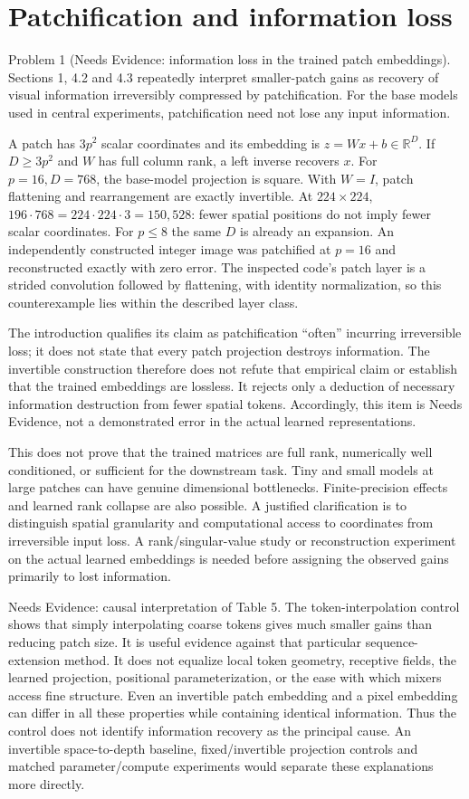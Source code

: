 \documentclass[10pt]{article}
\begin{document}
\section*{Patchification and information loss}
Problem 1 (Needs Evidence: information loss in the trained patch embeddings).  Sections 1, 4.2 and 4.3 repeatedly interpret smaller-patch gains as recovery of visual information irreversibly compressed by patchification. For the base models used in central experiments, patchification need not lose any input information.\par
A patch has \(3p^2\) scalar coordinates and its embedding is \(z=Wx+b\in\mathbb R^D\). If \(D\geq3p^2\) and \(W\) has full column rank, a left inverse recovers \(x\). For \(p=16,D=768\), the base-model projection is square. With \(W=I\), patch flattening and rearrangement are exactly invertible. At \(224\times224\), \(196\cdot768=224\cdot224\cdot3=150{,}528\): fewer spatial positions do not imply fewer scalar coordinates. For \(p\leq8\) the same \(D\) is already an expansion. An independently constructed integer image was patchified at \(p=16\) and reconstructed exactly with zero error. The inspected code’s patch layer is a strided convolution followed by flattening, with identity normalization, so this counterexample lies within the described layer class.\par
The introduction qualifies its claim as patchification “often” incurring irreversible loss; it does not state that every patch projection destroys information. The invertible construction therefore does not refute that empirical claim or establish that the trained embeddings are lossless. It rejects only a deduction of necessary information destruction from fewer spatial tokens. Accordingly, this item is Needs Evidence, not a demonstrated error in the actual learned representations.\par
This does not prove that the trained matrices are full rank, numerically well conditioned, or sufficient for the downstream task. Tiny and small models at large patches can have genuine dimensional bottlenecks. Finite-precision effects and learned rank collapse are also possible. A justified clarification is to distinguish spatial granularity and computational access to coordinates from irreversible input loss. A rank/singular-value study or reconstruction experiment on the actual learned embeddings is needed before assigning the observed gains primarily to lost information.\par
Needs Evidence: causal interpretation of Table 5. The token-interpolation control shows that simply interpolating coarse tokens gives much smaller gains than reducing patch size. It is useful evidence against that particular sequence-extension method. It does not equalize local token geometry, receptive fields, the learned projection, positional parameterization, or the ease with which mixers access fine structure. Even an invertible patch embedding and a pixel embedding can differ in all these properties while containing identical information. Thus the control does not identify information recovery as the principal cause. An invertible space-to-depth baseline, fixed/invertible projection controls and matched parameter/compute experiments would separate these explanations more directly.\par
\end{document}
